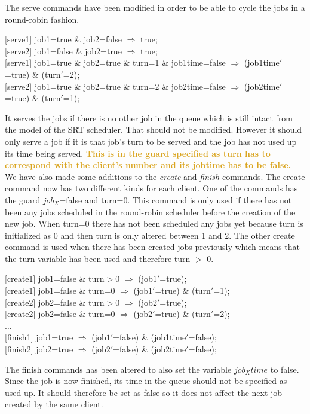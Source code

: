 \documentclass[12pt]{report}
\begin{document}
The serve commands have been modified in order to be able to cycle the jobs in a round-robin fashion.
\begin{center}
{[serve1]} job1=true \& job2=false $\Rightarrow$ true;\\
{[serve2]} job1=false \& job2=true $\Rightarrow$ true;\\
{[serve1]} job1=true \& job2=true \& turn=1 \& job1time=false $\Rightarrow$ (job1time$'$=true) \& (turn$'$=2);\\
{[serve2]} job1=true \& job2=true \& turn=2 \& job2time=false $\Rightarrow$ (job2time$'$=true) \& (turn$'$=1);
\end{center}
It serves the jobs if there is no other job in the queue which is still intact from the model of the SRT scheduler. That should not be modified. However it should only serve a job if it is that job's turn to be served and the job has not used up its time being served. \textbf{\textcolor{Goldenrod}{This is in the guard specified as turn has to correspond with the client's number and its jobtime has to be false.}}\\
We have also made some additions to the \emph{create} and \emph{finish} commands. The create command now has two different kinds for each client. One of the commands has the guard $job_X$=false and turn=0. This command is only used if there has not been any jobs scheduled in the round-robin scheduler before the creation of the new job. When turn=0 there has not been scheduled any jobs yet because turn is initialized as 0 and then turn is only altered between 1 and 2. The other create command is used when there has been created jobs previously which means that the turn variable has been used and therefore turn $>$ 0.
\begin{center}
{[create1]} job1=false \& turn$>$0 $\Rightarrow$ (job$1'$=true);\\
{[create1]} job1=false \& turn=0 $\Rightarrow$ (job$1'$=true) \& (turn$'$=1);\\
{[create2]} job2=false \& turn$>$0 $\Rightarrow$ (job$2'$=true);\\
{[create2]} job2=false \& turn=0 $\Rightarrow$ (job$2'$=true) \& (turn$'$=2);\\
$\dots$\\
{[finish1]} job1=true $\Rightarrow$ (job$1'$=false) \& (job1time$'$=false);\\
{[finish2]} job2=true $\Rightarrow$ (job$2'$=false) \& (job2time$'$=false);
\end{center}
The finish commands has been altered to also set the variable $job_Xtime$ to false. Since the job is now finished, its time in the queue should not be specified as used up. It should therefore be set as false so it does not affect the next job created by the same client.\\
\end{document}

